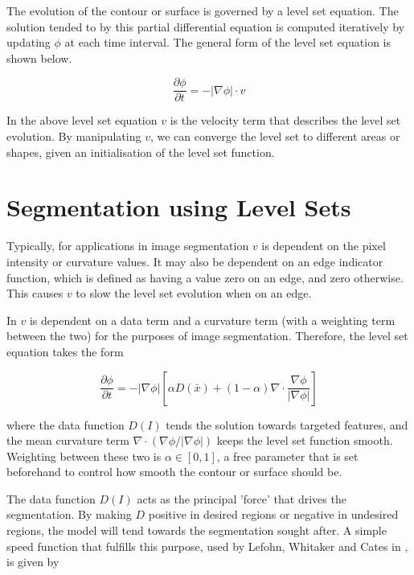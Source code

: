 The evolution of the contour or surface is governed by a level set equation. The solution tended to by this partial differential equation is computed iteratively by updating $\phi$ at each time interval. The general form of the level set equation is shown below.

	\begin{equation}
	\frac{\partial{\phi}}{\partial{t}}=-|\nabla{\phi|}\cdot v
	\end{equation}

In the above level set equation $v$ is the velocity term that describes the level set evolution. By manipulating $v$, we can converge the level set to different areas or shapes, given an initialisation of the level set function. 

\section{Segmentation using Level Sets}
Typically, for applications in image segmentation $v$ is dependent on the pixel intensity or curvature values. It may also be dependent on an edge indicator function, which is defined as having a value zero on an edge, and zero otherwise. This causes $v$ to slow the level set evolution when on an edge.

In \cite{Lefohn04astreaming} $v$ is dependent on a data term and a curvature term (with a weighting term between the two) for the purposes of image segmentation. Therefore, the level set equation takes the form

	\begin{equation}
	\frac{\partial{\phi}}{\partial{t}}=-|\nabla{\phi}|\left[\alpha D(\bar{x})  + (1-\alpha)\nabla \cdot{\frac{\nabla{\phi}}{|\nabla{\phi|}}}\right]
	\end{equation}

where the data function $D(I)$ tends the solution towards targeted features, and the mean curvature term $\nabla \cdot{(\nabla{\phi}/|\nabla{\phi|})}$ keeps the level set function smooth. Weighting between these two is $\alpha \in [0,1]$, a free parameter that is set beforehand to control how smooth the contour or surface should be.

The data function $D(I)$ acts as the principal 'force' that drives the segmentation. By making $D$ positive in desired regions or negative in undesired regions, the model will tend towards the segmentation sought after. A simple speed function that fulfills this purpose, used by Lefohn, Whitaker and Cates in \cite{Lefohn04astreaming, gist}, is given by

